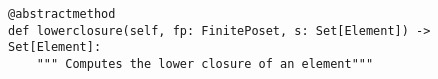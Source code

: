 \begin{verbatim}
@abstractmethod
def lowerclosure(self, fp: FinitePoset, s: Set[Element]) -> Set[Element]:
    """ Computes the lower closure of an element"""
\end{verbatim}